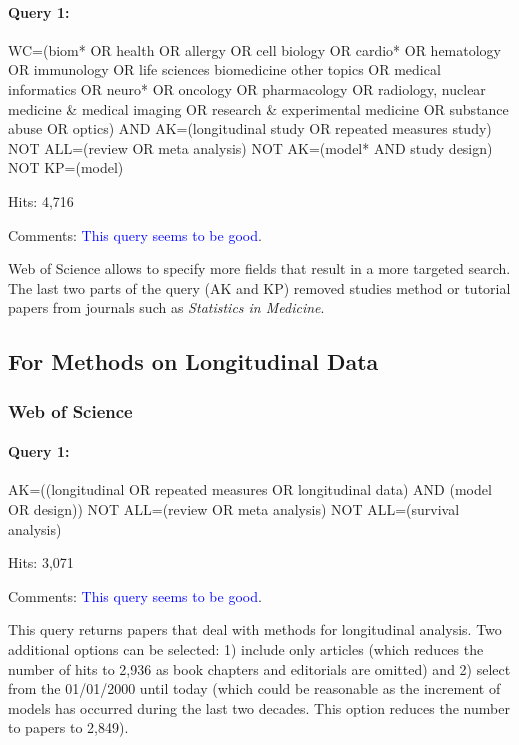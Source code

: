 \documentclass[
]{article}
\let\oldparagraph\paragraph
\renewcommand{\paragraph}[1]{\oldparagraph{#1}\mbox{}}
\begin{document}
\hypertarget{query-1-1}{%
\paragraph{Query 1:}\label{query-1-1}}

WC=(biom* OR health OR allergy OR cell biology OR cardio* OR hematology
OR immunology OR life sciences biomedicine other topics OR medical
informatics OR neuro* OR oncology OR pharmacology OR radiology, nuclear
medicine \& medical imaging OR research \& experimental medicine OR
substance abuse OR optics) AND AK=(longitudinal study OR repeated
measures study) NOT ALL=(review OR meta analysis) NOT AK=(model* AND
study design) NOT KP=(model)

Hits: 4,716

Comments: \textcolor{blue}{This query seems to be good}.

Web of Science allows to specify more fields that result in a more
targeted search. The last two parts of the query (AK and KP) removed
studies method or tutorial papers from journals such as \emph{Statistics
in Medicine}.

\hypertarget{for-methods-on-longitudinal-data}{%
\subsection{For Methods on Longitudinal
Data}\label{for-methods-on-longitudinal-data}}

\hypertarget{web-of-science-1}{%
\subsubsection{Web of Science}\label{web-of-science-1}}

\hypertarget{query-1-2}{%
\paragraph{Query 1:}\label{query-1-2}}

AK=((longitudinal OR repeated measures OR longitudinal data) AND (model
OR design)) NOT ALL=(review OR meta analysis) NOT ALL=(survival
analysis)

Hits: 3,071

Comments: \textcolor{blue}{This query seems to be good}.

This query returns papers that deal with methods for longitudinal
analysis. Two additional options can be selected: 1) include only
articles (which reduces the number of hits to 2,936 as book chapters and
editorials are omitted) and 2) select from the 01/01/2000 until today
(which could be reasonable as the increment of models has occurred
during the last two decades. This option reduces the number to papers to
2,849).
\end{document}
